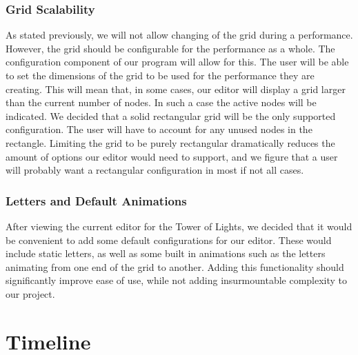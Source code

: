 \documentclass[12pt]{article}
\begin{document}
	\subsubsection{Grid Scalability}
	As stated previously, we will not allow changing of the grid during a performance. However, the grid should be configurable for the performance as a whole. The configuration component of our program will allow for this. The user will be able to set the dimensions of the grid to be used for the performance they are creating. This will mean that, in some cases, our editor will display a grid larger than the current number of nodes. In such a case the active nodes will be indicated. We decided that a solid rectangular grid will be the only supported configuration. The user will have to account for any unused nodes in the rectangle. Limiting the grid to be purely rectangular dramatically reduces the amount of options our editor would need to support, and we figure that a user will probably want a rectangular configuration in most if not all cases.
	\subsubsection{Letters and Default Animations}
	After viewing the current editor for the Tower of Lights, we decided that it would be convenient to add some default configurations for our editor. These would include static letters, as well as some built in animations such as the letters animating from one end of the grid to another. Adding this functionality should significantly improve ease of use, while not adding insurmountable complexity to our project. 
\newpage
	\section{Timeline}
	
\end{document}
